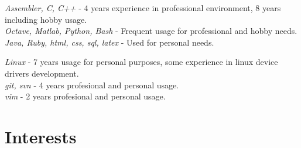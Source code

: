 \documentclass[12]{article}
\begin{document}
{
	\textit{Assembler, C, C++} - 4 years experience in professional environment, 8 years including hobby usage.\\
	\textit{Octave, Matlab, Python, Bash} - Frequent usage for professional and hobby needs.\\
	\textit{Java, Ruby, html, css, sql, latex} - Used for personal needs. \\

}

{
	\textit{Linux} - 7 years usage for personal purposes, some experience in linux device drivers development.\\
	\textit{git, svn} - 4 years profesional and personal usage.\\
	\textit{vim} - 2 years profesional and personal usage.\\
}


\section{Interests}

\end{document}
